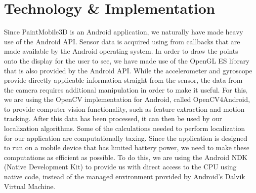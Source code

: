 \documentclass{chi-ext}
\begin{document}


\pagebreak

\section{Technology \& Implementation}

Since PaintMobile3D is an Android application, we naturally have made heavy
use of the Android API. Sensor data is acquired using from callbacks that are
made available by the Android operating system. In order to draw the points
onto the display for the user to see, we have made use of the OpenGL ES
library that is also provided by the Android API. While the accelerometer and
gyroscope provide directly applicable information straight from the sensor,
the data from the camera requires additional manipulation in order to make it
useful. For this, we are using the OpenCV implementation for Android, called
OpenCV4Android, to provide computer vision functionality, such as feature
extraction and motion tracking. After this data has been processed, it can
then be used by our localization algorithms. Some of the calculations needed
to perform localization for our application are computationally taxing. Since
the application is designed to run on a mobile device that has limited battery
power, we need to make these computations as efficient as possible. To do
this, we are using the Android NDK (Native Development Kit) to provide us with
direct access to the CPU using native code, instead of the managed environment
provided by Android's Dalvik Virtual Machine.
\end{document}
